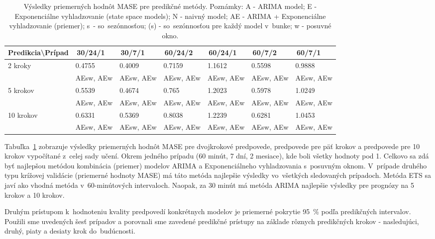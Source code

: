 \documentclass[thesismargins, thesislinespacing, openright, upjsfrontpage]{rnthesis}
\begin{document}
\begin{table}[h]
    \centering
    \footnotesize 
    \singlespacing 
    \begin{tabular}{|p{3cm}|p{1.5cm}|p{1.5cm}|p{1.5cm}|p{1.5cm}|p{1.5cm}|p{1.5cm}|} \hline
        Predikcia\textbackslash Prípad & \,30/24/1\, & \,30/7/1\, & \,60/24/2\, & \,60/24/1\, & \,60/7/2\, & \,60/7/1\, \\    
        \hline\hline
       \multirow{2}{*}{2 kroky} & 0.4755 & 0.4009 & 0.7159 & 1.1612 & 0.5598 & 0.9888 \\
       & AEsw, AEw & AEsw, AEw & AEsw, AEw & AEsw, AEw & AEsw, AEw & AEsw, AEw  \\
        \hline
        \multirow{2}{*}{5 krokov} & 0.5539 & 0.4674 & 0.765 & 1.2023 & 0.5978 & 1.0249 \\
        & AEsw, AEw & AEsw, AEw & AEsw, AEw & AEsw, AEw & AEsw, AEw & AEsw, AEw  \\
        \hline
        \multirow{2}{*}{10 krokov} & 0.6331 & 0.5369 & 0.8038 & 1.2239 & 0.6281 & 1.0453 \\
        & AEsw, AEw & AEsw, AEw & AEsw, AEw & AEsw, AEw & AEsw, AEw & AEsw, AEw  \\
        \hline     
    \end{tabular}
    \caption{Výsledky priemerných hodnôt MASE pre predikčné metódy. Poznámky: A - ARIMA model; E - Exponenciálne vyhladzovanie (state space models); N - naivný model; AE - ARIMA + Exponenciálne vyhladzovanie (priemer); s~- so~sezónnosťou; (s) - so~sezónnosťou pre každý model v~bunke; w - posuvné okno.}
    \label{tab:mase}
\end{table}

Tabuľka~\ref{tab:mase} zobrazuje výsledky priemerných hodnôt MASE pre dvojkrokové predpovede, predpovede pre päť krokov a predpovede pre 10 krokov vypočítané z~celej sady učení. Okrem jedného prípadu (60 minút, 7 dní, 2 mesiace), kde boli všetky hodnoty pod 1. Celkovo sa zdá byť najlepšou metódou kombinácia (priemer) modelov ARIMA a Exponenciálneho vyhladzovania s~posuvným oknom. V~prípade druhého typu krížovej validácie (priemerné hodnoty MASE) má táto metóda najlepšie výsledky vo~všetkých sledovaných prípadoch. Metóda ETS sa javí ako vhodná metóda v~60-minútových intervaloch. Naopak, za 30 minút má metóda ARIMA najlepšie výsledky pre prognózy na 5 krokov a 10 krokov.


Druhým prístupom k~hodnoteniu kvality predpovedí konkrétnych modelov je priemerné pokrytie 95~\% podľa predikčných intervalov. Použili sme uvedených šesť prípadov a porovnali sme zavedené predikčné prístupy na základe rôznych predikčných krokov - nasledujúci, druhý, piaty a desiaty krok do~budúcnosti.
\end{document}
